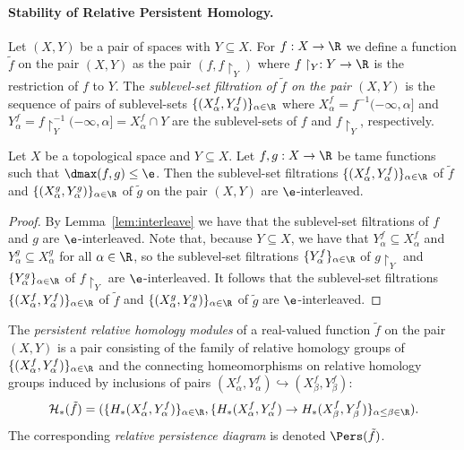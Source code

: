 \paragraph*{\textbf{Stability of Relative Persistent Homology.}} %
\label{par:stability_of_relative_persistent}

Let $(X, Y)$ be a pair of spaces with $Y\subseteq X$.
For $f:X\to\R$ we define a function $\tilde{f}$ on the pair $(X, Y)$ as the pair $(f, f\restriction_Y)$ where $f\restriction_Y:Y\to\R$ is the restriction of $f$ to $Y$.
The \emph{sublevel-set filtration of $\tilde{f}$ on the pair $(X, Y)$} is the sequence of pairs of sublevel-sets $\{(X_\alpha^f, Y_\alpha^f)\}_{\alpha\in\R}$ where $X_\alpha^f = f^{-1}(-\infty,\alpha]$ and $Y_\alpha^f = f\restriction_Y^{-1}(-\infty,\alpha] = X_\alpha^f\cap Y$ are the sublevel-sets of $f$ and $f\restriction_Y$, respectively.

\begin{lemma}\label{lem:relative_interleave}
    Let $X$ be a topological space and $Y\subseteq X$.
    Let $f,g:X\to\R$ be tame functions such that $\dmax(f, g)\leq\e$.
    Then the sublevel-set filtrations $\{(X_\alpha^f, Y_\alpha^f)\}_{\alpha\in\R}$ of $\tilde{f}$ and $\{(X_\alpha^g, Y_\alpha^g)\}_{\alpha\in\R}$ of $\tilde{g}$ on the pair $(X, Y)$ are $\e$-interleaved.
\end{lemma}
\begin{proof}
    By Lemma~\ref{lem:interleave} we have that the sublevel-set filtrations of $f$ and $g$ are $\e$-interleaved.
    Note that, because $Y\subseteq X$, we have that $Y^f_\alpha \subseteq X^f_\alpha$ and $Y^g_\alpha \subseteq X^g_\alpha$ for all $\alpha\in\R$, so the sublevel-set filtrations $\{Y^f_\alpha\}_{\alpha\in\R}$ of $g\restriction_Y$ and $\{Y^g_\alpha\}_{\alpha\in\R}$ of $f\restriction_Y$ are $\e$-interleaved.
    It follows that the sublevel-set filtrations $\{(X^f_\alpha, Y^f_\alpha)\}_{\alpha\in\R}$ of $\tilde{f}$ and $\{(X^g_\alpha, Y^g_\alpha)\}_{\alpha\in\R}$ of $\tilde{g}$ are $\e$-interleaved.
\end{proof}

The \emph{persistent relative homology modules} of a real-valued function $\tilde{f}$ on the pair $(X, Y)$ is a pair consisting of the family of relative homology groups of $\{(X^f_\alpha, Y^f_\alpha)\}_{\alpha\in\R}$ and the connecting homeomorphisms on relative homology groups induced by inclusions of pairs $(X^f_\alpha, Y^f_\alpha)\hookrightarrow (X^f_\beta, Y^f_\beta)$:
\[\mathcal{H}_*(\tilde{f}) = (\{H_*(X^f_\alpha, Y^f_\alpha)\}_{\alpha\in\R}, \{H_*(X^f_\alpha, Y^f_\alpha)\to H_*(X^f_\beta, Y^f_\beta)\}_{\alpha\leq\beta\in\R}).\]
The corresponding \emph{relative persistence diagram} is denoted $\Pers(\tilde{f})$.

